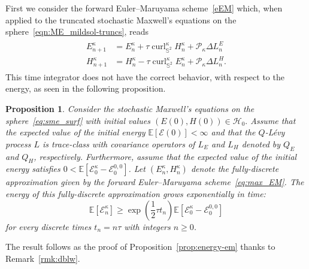 \documentclass[11pt]{amsart}
\newtheorem{proposition}[theorem]{Proposition}
\newcommand{\E}{{\mathbb E}}
\newcommand{\IS}{\mathbb{S}}
\newcommand{\cE}{\mathcal E}
\newcommand{\cP}{\mathcal{P}}
\begin{document}
First we consider the forward Euler--Maruyama scheme~\eqref{eEM} which, when applied to the truncated stochastic Maxwell's equations on the sphere~\eqref{eqn:ME_mildsol-truncs}, reads
\begin{align}\label{eq:max_EM}
	\begin{split}
		E^\kappa_{n+1}&=E^\kappa_{n}+\tau\operatorname{curl}^\kappa_{\IS^2}H^\kappa_n+\cP_\kappa \Delta L^E_n\\
		H^\kappa_{n+1}&=H^\kappa_{n}-\tau\operatorname{curl}^\kappa_{\IS^2}E^\kappa_n+\cP_\kappa \Delta L^H_n.
	\end{split}
\end{align}
This time integrator does not have the correct behavior, with respect to the energy, as seen in the following proposition.
\begin{proposition}\label{prop:energy-em_max}
	Consider the stochastic Maxwell's equations on the sphere~\eqref{eq:sme_surf} with initial values $(E(0),H(0))\in \mathcal H_0.$
	Assume that the expected value of the initial energy $\E\left[\mathcal{E}(0)\right]<\infty$ and that the $Q$-L\'evy process $L$
	is trace-class with covariance operators of $L_E$ and $L_H$ denoted by $Q_E$ and $Q_H$, respectively.
	Furthermore, assume that the expected value of the initial energy satisfies $0<\E\left[\mathcal{E}^\kappa_0-\cE_0^{0,0}\right]$.
	Let $(E_{n}^\kappa, H_{n}^\kappa)$ denote the fully-discrete approximation given by the forward Euler--Maruyama scheme~\eqref{eq:max_EM}.
	The energy of this fully-discrete approximation grows exponentially in time:
	\begin{equation*}
		\E\left[\mathcal{E}^\kappa_n\right] \geq \exp\left(\frac12\tau t_n\right)\E\left[\mathcal{E}^\kappa_0 - \mathcal{E}_0^{0,0}\right]
	\end{equation*}
	for every discrete times $t_n=n\tau$ with integers $n\geq0$.
\end{proposition}

\begin{appendixproof}
	The result follows as the proof of Proposition~\ref{prop:energy-em} thanks to Remark~\ref{rmk:dblw}.
\end{appendixproof}
\end{document}
